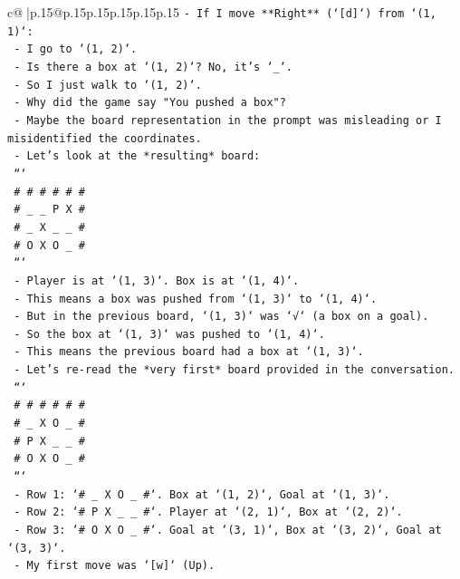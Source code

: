\documentclass{article}
\begin{document}
{\begin{supertabular}{c@{$\;$}|p{.15\linewidth}@{}p{.15\linewidth}p{.15\linewidth}p{.15\linewidth}p{.15\linewidth}p{.15\linewidth}}
{{{\texttt{{-} If I move **Right** (`{[}d{]}`) from `(1, 1)`:} \\
\texttt{  {-} I go to `(1, 2)`.} \\
\texttt{  {-} Is there a box at `(1, 2)`? No, it's `\_`.} \\
\texttt{  {-} So I just walk to `(1, 2)`.} \\
\texttt{  {-} Why did the game say "You pushed a box"?} \\
\texttt{  {-} Maybe the board representation in the prompt was misleading or I misidentified the coordinates.} \\
\texttt{  {-} Let's look at the *resulting* board:} \\
\texttt{    ```} \\
\texttt{    \# \# \# \# \# \#} \\
\texttt{    \# \_ \_ P X \#} \\
\texttt{    \# \_ X \_ \_ \#} \\
\texttt{    \# O X O \_ \#} \\
\texttt{    ```} \\
\texttt{  {-} Player is at `(1, 3)`. Box is at `(1, 4)`.} \\
\texttt{  {-} This means a box was pushed from `(1, 3)` to `(1, 4)`.} \\
\texttt{  {-} But in the previous board, `(1, 3)` was `√` (a box on a goal).} \\
\texttt{  {-} So the box at `(1, 3)` was pushed to `(1, 4)`.} \\
\texttt{  {-} This means the previous board had a box at `(1, 3)`.} \\
\texttt{  {-} Let's re{-}read the *very first* board provided in the conversation.} \\
\texttt{    ```} \\
\texttt{    \# \# \# \# \# \#} \\
\texttt{    \# \_ X O \_ \#} \\
\texttt{    \# P X \_ \_ \#} \\
\texttt{    \# O X O \_ \#} \\
\texttt{    ```} \\
\texttt{    {-} Row 1: `\# \_ X O \_ \#`. Box at `(1, 2)`, Goal at `(1, 3)`.} \\
\texttt{    {-} Row 2: `\# P X \_ \_ \#`. Player at `(2, 1)`, Box at `(2, 2)`.} \\
\texttt{    {-} Row 3: `\# O X O \_ \#`. Goal at `(3, 1)`, Box at `(3, 2)`, Goal at `(3, 3)`.} \\
\texttt{  {-} My first move was `{[}w{]}` (Up).} \\
}}}
\end{supertabular}}
\end{document}
